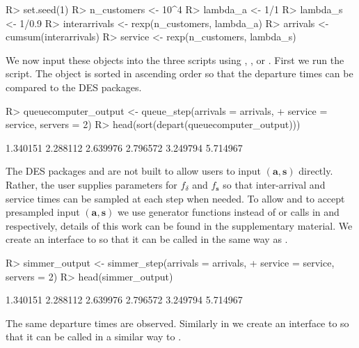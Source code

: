 \documentclass[article]{jss}
\begin{document}
\begin{Code}
R> set.seed(1)
R> n_customers <- 10^4
R> lambda_a <- 1/1
R> lambda_s <- 1/0.9
R> interarrivals <- rexp(n_customers, lambda_a)
R> arrivals <- cumsum(interarrivals)
R> service <- rexp(n_customers, lambda_s)
\end{Code}

We now input these objects into the three scripts using , , or . First we run the  script. The  object is sorted in ascending order so that the departure times can be compared to the DES packages.

\begin{CodeChunk}
\begin{Sinput}
R> queuecomputer_output <- queue_step(arrivals = arrivals, 
+    service = service, servers = 2)
R> head(sort(depart(queuecomputer_output)))
\end{Sinput}
\begin{Soutput}
[1] 1.340151 2.288112 2.639976 2.796572 3.249794 5.714967
\end{Soutput}
\end{CodeChunk}

The DES packages  and  are not built to allow users to input $(\mathbf{a,s})$ directly. Rather, the user supplies parameters for $f_{\delta}$ and $f_{\mathbf{s}}$ so that inter-arrival and service times can be sampled at each step when needed. To allow  and  to accept presampled input $(\mathbf{a,s})$ we use generator functions instead of  or  calls in  and  respectively, details of this work can be found in the supplementary material. We create an interface to  so that it can be called in the same way as . 

\begin{CodeChunk}
\begin{Sinput}
R> simmer_output <- simmer_step(arrivals = arrivals, 
+    service = service, servers = 2)
R> head(simmer_output)
\end{Sinput}
\begin{Soutput}
[1] 1.340151 2.288112 2.639976 2.796572 3.249794 5.714967
\end{Soutput}
\end{CodeChunk}

The same departure times are observed. Similarly in  we create an interface to  so that it can be called in a similar way to . 
\end{document}
